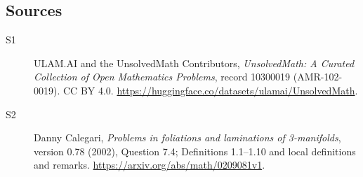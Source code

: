 \documentclass[11pt]{article}
\begin{document}
\subsection{Sources}
\begin{description}
\item[\hypertarget{source:10300019:1}{S1}] ULAM.AI and the UnsolvedMath Contributors, \emph{UnsolvedMath: A Curated Collection of Open Mathematics Problems}, record 10300019 (AMR-102-0019). CC BY 4.0. \url{https://huggingface.co/datasets/ulamai/UnsolvedMath}.
\item[\hypertarget{source:10300019:2}{S2}] Danny Calegari, \emph{Problems in foliations and laminations of 3-manifolds}, version 0.78 (2002), Question 7.4; Definitions 1.1--1.10 and local definitions and remarks. \url{https://arxiv.org/abs/math/0209081v1}.
\end{description}
\label{end:10300019}
\end{document}
